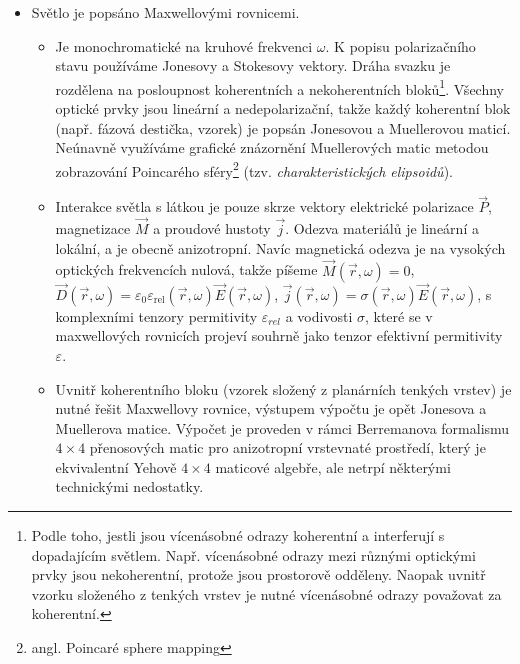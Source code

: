 \begin{itemize}
    \item Světlo je popsáno Maxwellovými rovnicemi.
        \begin{itemize}
            \item 
                Je monochromatické na kruhové frekvenci $\omega$. 
                K popisu polarizačního stavu používáme Jonesovy a Stokesovy vektory.
                Dráha svazku je rozdělena na posloupnost koherentních a nekoherentních bloků\footnote{Podle toho, jestli jsou vícenásobné odrazy koherentní a interferují s dopadajícím světlem. Např. vícenásobné odrazy mezi různými optickými prvky jsou nekoherentní, protože jsou prostorově odděleny. Naopak uvnitř vzorku složeného z tenkých vrstev je nutné vícenásobné odrazy považovat za koherentní.}.
                Všechny optické prvky jsou lineární a nedepolarizační, takže každý koherentní blok (např. fázová destička, vzorek) je popsán Jonesovou a Muellerovou maticí\cite{gilReviewMuellerMatrix2014}.
                Neúnavně využíváme grafické znázornění Muellerových matic metodou zobrazování Poincarého sféry\footnote{angl. Poincaré sphere mapping} (tzv. \emph{charakteristických elipsoidů})\cite{gilReviewMuellerMatrix2014,ossikovskiPoincareSphereMapping2013}.
            \item 
                Interakce světla s látkou je pouze skrze vektory elektrické polarizace $\vec{P}$, magnetizace $\vec{M}$ a proudové hustoty $\vec{j}$. 
                Odezva materiálů je lineární a lokální, a je obecně anizotropní. 
                Navíc magnetická odezva je na vysokých optických frekvencích nulová, takže píšeme $\vec{M}(\vec{r},\omega)=0$, $\vec{D}(\vec{r},\omega)=\varepsilon_0\varepsilon_{\textrm{rel}}(\vec{r},\omega)\vec{E}(\vec{r},\omega)$, $\vec{j}(\vec{r},\omega)=\sigma(\vec{r},\omega)\vec{E}(\vec{r},\omega)$, s komplexními tenzory permitivity $\varepsilon_{rel}$ a vodivosti $\sigma$, které se v maxwellových rovnicích projeví souhrně jako tenzor efektivní permitivity $\varepsilon$.
            \item
                Uvnitř koherentního bloku (vzorek složený z planárních tenkých vrstev) je nutné řešit Maxwellovy rovnice, výstupem výpočtu je opět Jonesova a Muellerova matice.
                Výpočet je proveden v rámci Berremanova formalismu\cite{berremanOpticsStratifiedAnisotropic1972} $4\times 4$ přenosových matic pro anizotropní vrstevnaté prostředí, který je ekvivalentní Yehově $4\times 4$ maticové algebře\cite{yehElectromagneticPropagationBirefringent1979}, ale netrpí některými technickými nedostatky\cite{xuOpticalDegeneraciesAnisotropic2000,wuSingularitiesMatrixFormalisms2018,garibelloSingularityYehTransfer2020,bertrandGeneralAnalyticalTreatment2001}.
        \end{itemize}
        

\end{itemize}
